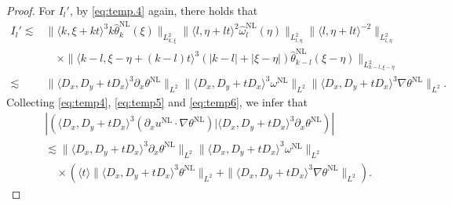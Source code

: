 \documentclass[reqno, 12pt]{amsart} %
\theoremstyle{plain} %
\theoremstyle{definition}
\theoremstyle{remark}
\numberwithin{equation}{section} %
\newcommand{\no}{\nonumber}
\newcommand{\px}{\partial_x}
\begin{document}
\begin{proof}
		For $I_{l}'$, by \eqref{eq:temp.4} again, there holds that
		\begin{equation}\begin{aligned} \label{eq:temp6}
				I_{l}' \lesssim & \|\langle k, \xi+k t\rangle^3 k\hat{\theta}_k^{\mathrm{NL}}(\xi)\|_{L_{k, \xi}^2}  \|\langle l, \eta+l t\rangle^2 \hat{\omega}_l^{\mathrm{NL}}(\eta)\|_{L_{l, \eta}^2}  \|\langle l, \eta + l t\rangle^{-2}\|_{L_{l, \eta}^2} \\
				& \quad \times\|\langle k-l, \xi-\eta+(k-l) t\rangle^3 \left(|k-l|+|\xi-\eta|\right) \hat{\theta}_{k-l}^{\mathrm{NL}}(\xi-\eta)\|_{L_{k-l, \xi-\eta}^2} \\
				\lesssim &   \|\langle D_x, D_y+t D_x\rangle^3 \px \theta^{\mathrm{NL}}\|_{L^2}  \|\langle D_x, D_y+t D_x\rangle^3   \omega^{\mathrm{NL}}\|_{L^2}     \|\langle D_x, D_y+t D_x\rangle^3 \nabla \theta^{\mathrm{NL}}\|_{L^2}.
		\end{aligned}\end{equation}
		Collecting \eqref{eq:temp4}, \eqref{eq:temp5} and \eqref{eq:temp6}, we infer that
		\begin{align} \label{eq:6}
			&\no\left|\left(\langle D_x, D_y+t D_x\rangle^3( \px u^{\mathrm{NL}} \cdot \nabla \theta^{\mathrm{NL}}) \big| \langle D_x, D_y+t D_x\rangle^3 \px \theta^{\mathrm{NL}}\right)\right| \\
			&\no\lesssim \|\langle D_x, D_y+t D_x\rangle^3 \px \theta^{\mathrm{NL}}\|_{L^2}  \|\langle D_x, D_y+t D_x\rangle^3  \omega^{\mathrm{NL}}\|_{L^2}  \\
			&\quad \times   \left(  \langle t \rangle \|\langle D_x, D_y+t D_x\rangle^3 \theta^{\mathrm{NL}}\|_{L^2}  +  \|\langle D_x, D_y+t D_x\rangle^3 \nabla \theta^{\mathrm{NL}}\|_{L^2} \right).
		\end{align}
		

\end{proof}
\end{document}
